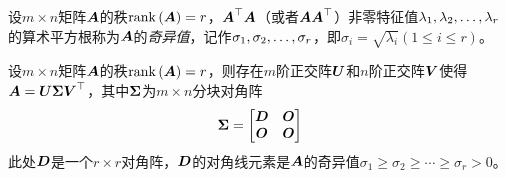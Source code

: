 \documentclass{ctexart}
\begin{document}
\begin{definition}[奇异值]
    设\(m\times n\)矩阵\(\boldsymbol{A}\)的秩\(\mathrm{rank}\left( \boldsymbol{A} \right)=r\)，\(\boldsymbol{A}^\top\boldsymbol{A}\)（或者\(\boldsymbol{A}\boldsymbol{A}^\top\)）非零特征值\({\lambda}_1,{\lambda}_2,\dots,{\lambda}_{r}\)的算术平方根称为\(\boldsymbol{A}\)的\emph{奇异值}，记作\({\sigma}_1,{\sigma}_2,\dots,{\sigma}_{r}\)，即\(\sigma_i=\sqrt{\lambda_i}(1\le i\le r)\)。
\end{definition}

\begin{theorem}[奇异值分解]
    设\(m\times n\)矩阵\(\boldsymbol{A}\)的秩\(\mathrm{rank}\left( \boldsymbol{A} \right)=r\)，则存在\(m\)阶正交阵\(\boldsymbol{U}\)和\(n\)阶正交阵\(\boldsymbol{V}\)使得\(\boldsymbol{A}=\boldsymbol{U}\boldsymbol{\Sigma}\boldsymbol{V}^\top\)，其中\(\boldsymbol{\Sigma}\)为\(m\times n\)分块对角阵
    \begin{equation*}
        \boldsymbol{\Sigma}=\begin{bmatrix}
            \boldsymbol{D} & \boldsymbol{O} \\\boldsymbol{O}&\boldsymbol{O}
        \end{bmatrix}
    \end{equation*}
    此处\(\boldsymbol{D}\)是一个\(r\times r\)对角阵，\(\boldsymbol{D}\)的对角线元素是\(\boldsymbol{A}\)的奇异值\(\sigma_1\ge\sigma_2\ge\cdots\ge\sigma_r>0\)。
\end{theorem}
\end{document}

